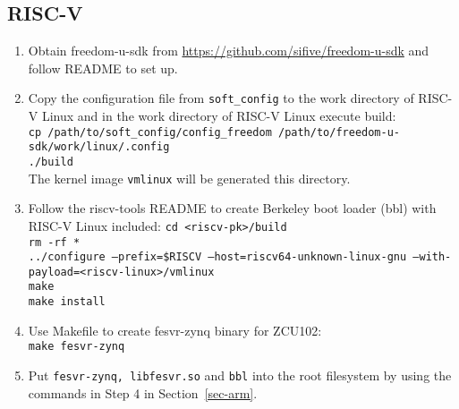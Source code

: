 \documentclass[a4paper,11pt]{article}
\begin{document}
\subsection{RISC-V}
\begin{enumerate}
\item Obtain freedom-u-sdk from \url{https://github.com/sifive/freedom-u-sdk} and follow README to set up.

\item Copy the configuration file from {\tt soft\_config} to the work directory of RISC-V Linux and in the work directory of RISC-V Linux execute build:\\
{\tt cp /path/to/soft\_config/config\_freedom /path/to/freedom-u-sdk/work/linux/.config}\\
{\tt ./build}\\
The kernel image {\tt vmlinux} will be generated this directory.

\item Follow the riscv-tools README to create Berkeley boot loader (bbl) with RISC-V Linux included:
{\tt cd <riscv-pk>/build\\
rm -rf *\\
../configure --prefix=\$RISCV --host=riscv64-unknown-linux-gnu --with-payload=<riscv-linux>/vmlinux\\
make\\
make install}

\item Use Makefile to create fesvr-zynq binary for ZCU102:\\
{\tt make fesvr-zynq}

\item Put {\tt fesvr-zynq, libfesvr.so} and {\tt bbl} into the root filesystem by using the commands in Step 4 in Section~\ref{sec-arm}.
\end{enumerate}
\end{document}
